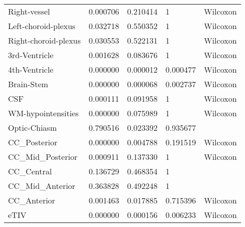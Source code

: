 \begin{tabular}{lllll}
Right-vessel & 0.000706 & 0.210414 & 1 & Wilcoxon \\
Left-choroid-plexus & 0.032718 & 0.550352 & 1 & Wilcoxon \\
Right-choroid-plexus & 0.030553 & 0.522131 & 1 & Wilcoxon \\
3rd-Ventricle & 0.001628 & 0.083676 & 1 & Wilcoxon \\
4th-Ventricle & 0.000000 & 0.000012 & 0.000477 & Wilcoxon \\
Brain-Stem & 0.000000 & 0.000068 & 0.002737 & Wilcoxon \\
CSF & 0.000111 & 0.091958 & 1 & Wilcoxon \\
WM-hypointensities & 0.000000 & 0.075989 & 1 & Wilcoxon \\
Optic-Chiasm & 0.790516 & 0.023392 & 0.935677 &  \\
CC_Posterior & 0.000000 & 0.004788 & 0.191519 & Wilcoxon \\
CC_Mid_Posterior & 0.000911 & 0.137330 & 1 & Wilcoxon \\
CC_Central & 0.136729 & 0.468354 & 1 &  \\
CC_Mid_Anterior & 0.363828 & 0.492248 & 1 &  \\
CC_Anterior & 0.001463 & 0.017885 & 0.715396 & Wilcoxon \\
eTIV & 0.000000 & 0.000156 & 0.006233 & Wilcoxon \\
\bottomrule
\end{tabular}
